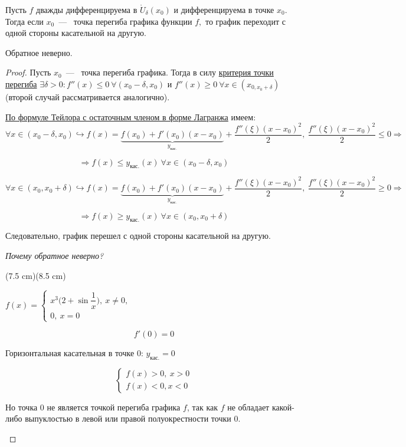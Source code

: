 \begin{theorem}
	Пусть $f$ дважды дифференцируема в $\mathring{U}_{\delta}(x_{0})$ и дифференцируема в точке $x_{0}$. Тогда если $x_{0}$~---~ точка перегиба графика функции $f,$ то график переходит с одной стороны касательной на другую. 
	
	Обратное неверно.
\end{theorem}
\begin{proof}
	Пусть $x_{0}$~---~ точка перегиба графика. Тогда в силу \hyperlink{thrm5.27}{критерия точки перегиба} $\exists \delta > 0: f''(x) \leq 0 \ \forall (x_{0} - \delta, x_{0})$ и $f''(x) \geq 0 \ \forall x\in (x_{0, x_{0} + \delta})$ (второй случай рассматривается аналогично).
	
	\hyperlink{thrm5.15}{По формуле Тейлора с остаточным членом в форме Лагранжа} имеем:
	$$\forall x\in (x_{0} - \delta, x_{0}) \hookrightarrow f(x) = \underbrace{f(x_{0}) + f'(x_{0})(x-x_{0})}_{y_{\textrm{кас.}}} + \dfrac{f''(\xi)(x-x_{0})^{2}}{2}, \ \dfrac{f''(\xi)(x-x_{0})^{2}}{2} \leq 0 \Rightarrow$$
	
	$$ \Rightarrow f(x) \leq y_{\textrm{кас.}}(x) \ \forall x\in (x_{0}-\delta, x_{0})$$
	
	$$\forall x\in (x_{0}, x_{0} + \delta) \hookrightarrow f(x) = \underbrace{f(x_{0}) + f'(x_{0})(x-x_{0})}_{y_{\textrm{кас.}}} + \dfrac{f''(\xi)(x-x_{0})^{2}}{2}, \ \dfrac{f''(\xi)(x-x_{0})^{2}}{2} \geq 0 \Rightarrow$$
	
	$$ \Rightarrow f(x) \geq y_{\textrm{кас.}}(x) \ \forall x\in (x_{0}, x_{0} + \delta)$$
	
	Следовательно, график перешел с одной стороны касательной на другую.
	
	\textit{Почему обратное неверно?}

	\sidefig(7.5 cm)(8.5 cm)	
	{\begin{flushleft}
			\normalsize{
	\begin{example}
		$f(x) = \begin{cases}
			x^{3}\Big(2+\sin\dfrac{1}{x}\Big), \ x\neq 0, \\
			0, \ x=0
		\end{cases}$
		
		$$f'(0) = 0$$
		
		Горизонтальная касательная в точке $0$: $y_{\textrm{кас.}}  = 0$
			
		$$\begin{cases}
			f(x) > 0, \ x> 0 \\
			f(x) < 0, x< 0
		\end{cases}$$
		
		Но точка $0$ не является точкой перегиба графика $f$, так как $f$ не обладает какой-либо выпуклостью в левой или правой полуокрестности точки $0$.
	\end{example}}
	\end{flushleft}
	}
	{
	
	}
\end{proof}

